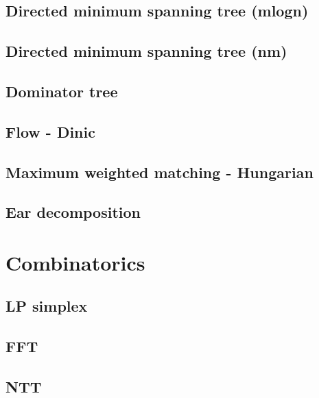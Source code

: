 \subsection{Directed minimum spanning tree (mlogn)}
\raggedbottom
\hrulefill
\subsection{Directed minimum spanning tree (nm)}
\raggedbottom
\hrulefill
\subsection{Dominator tree}
\raggedbottom
\hrulefill
\subsection{Flow - Dinic}
\raggedbottom
\hrulefill
\subsection{Maximum weighted matching - Hungarian}
\raggedbottom
\hrulefill
\subsection{Ear decomposition}
\raggedbottom
\hrulefill

\section{Combinatorics}
\subsection{LP simplex}
\raggedbottom
\hrulefill
\subsection{FFT}
\raggedbottom
\hrulefill
\subsection{NTT}
\raggedbottom
\hrulefill

